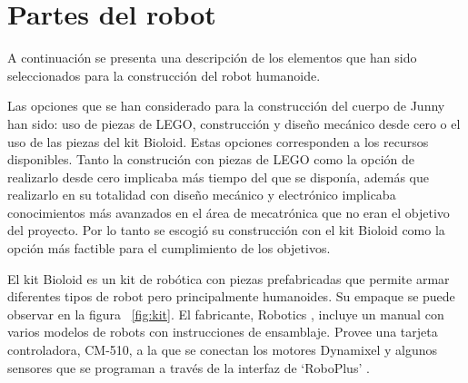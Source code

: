 

\section{Partes del robot}\label{sec:diseno}

A continuación se presenta una descripción de los elementos que han sido seleccionados para la construcción del robot humanoide. 

Las opciones que se han considerado para la construcci\'on del cuerpo de Junny han sido: uso de piezas de \gls{LEGO}, construcci\'on y dise\~no mec\'anico desde cero o el uso de las piezas del kit Bioloid. Estas opciones corresponden a los recursos disponibles. Tanto la construci\'on con piezas de \gls{LEGO} como la opci\'on de realizarlo desde cero implicaba más tiempo del que se disponía, adem\'as que realizarlo en su totalidad con dise\~no mec\'anico y electr\'onico implicaba conocimientos m\'as avanzados en el \'area de mecatr\'onica que no eran el objetivo del proyecto. Por lo tanto se escogi\'o su construcci\'on con el kit Bioloid como la opci\'on m\'as factible para el cumplimiento de los objetivos. 

El kit Bioloid es un kit de robótica con piezas prefabricadas que permite armar diferentes tipos de robot pero principalmente humanoides. Su empaque se puede observar en la figura ~\ref{fig:kit}. El fabricante, Robotics \cite{robotics}, incluye un manual con varios modelos de robots con instrucciones de ensamblaje. Provee una tarjeta controladora, CM-510, a la que se conectan los motores Dynamixel y algunos sensores que se programan a través de la interfaz de ‘RoboPlus’ \cite{robotics}.

